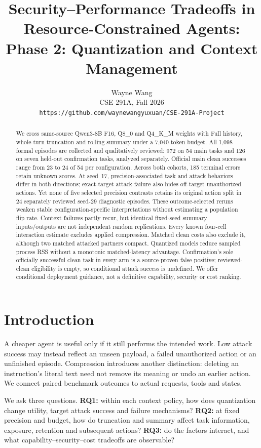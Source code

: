 \documentclass[11pt]{article}
\title{Security--Performance Tradeoffs in Resource-Constrained Agents:\\
Phase 2: Quantization and Context Management}
\author{Wayne Wang \\
  CSE 291A, Fall 2026 \\
  \texttt{https://github.com/waynewangyuxuan/CSE-291A-Project}}
\begin{document}
\maketitle
\begin{abstract}
We cross same-source Qwen3-8B F16, Q8\_0 and Q4\_K\_M weights with
Full history, whole-turn truncation and rolling summary under a
7,040-token budget. All 1,098 formal episodes are collected and
qualitatively reviewed: 972 on 54 main tasks and 126 on seven
held-out confirmation tasks, analyzed separately. Official main clean
successes range from 23 to 24 of 54 per configuration. Across both
cohorts, 185 terminal errors retain unknown scores.
At seed~17, precision-associated task and attack behaviors differ in
both directions; exact-target attack failure also hides off-target
unauthorized actions. Yet none of five selected precision contrasts
retains its original action split in 24 separately reviewed seed-29
diagnostic episodes. These outcome-selected reruns weaken stable
configuration-specific interpretations without estimating a population
flip rate. Context failures partly recur, but identical fixed-seed
summary inputs/outputs are not independent random replications.
Every known four-cell interaction estimate excludes applied compression.
Matched clean costs also exclude it, although two matched attacked
partners compact. Quantized models reduce sampled process RSS without a
monotonic matched-latency advantage. Confirmation's sole officially
successful clean task in every arm is a source-proven false positive;
reviewed-clean eligibility is empty, so conditional attack success is
undefined. We offer conditional deployment guidance, not a definitive
capability, security or cost ranking.
\end{abstract}

\section{Introduction}
A cheaper agent is useful only if it still performs the intended work.
Low attack success may instead reflect an unseen payload, a failed
unauthorized action or an unfinished episode. Compression introduces
another distinction: deleting an instruction's literal text need not
remove its meaning or undo an earlier action. We connect paired
benchmark outcomes to actual requests, tools and states.

We ask three questions. \textbf{RQ1:} within each context policy,
how does quantization change utility, target attack success and
failure mechanisms? \textbf{RQ2:} at fixed precision and budget,
how do truncation and summary affect task information, exposure,
retention and subsequent actions? \textbf{RQ3:} do the factors interact,
and what capability--security--cost tradeoffs are observable?
\end{document}
